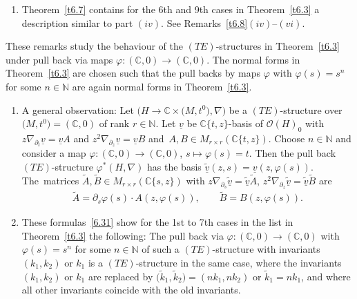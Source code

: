 \documentclass[10pt,a4paper]{amsart}
\numberwithin{equation}{section}
\numberwithin{figure}{section}
\newcommand{\N}{{\mathbb N}}
\newcommand{\C}{{\mathbb C}}
\newcommand{\OO}{{\mathcal O}}
\newcommand{\www}{\widetilde}
\newcommand{\uuuu}{\underline}
\newcommand{\paa}{\partial}
\newcommand{\nnn}{\nabla}
\begin{document}
\begin{Remarks}
\begin{enumerate}
{}

\item[$(v)$] Theorem~\ref{t6.7} contains for the 6th and 9th cases
in Theorem~\ref{t6.3} a description similar to part $(iv)$.
See Remarks~\ref{t6.8}$(iv)$--$(vi)$.
\end{enumerate}
\end{Remarks}


\begin{Remarks}\label{t6.5}
These remarks study the behaviour of the $(TE)$-structures
in Theorem~\ref{t6.3} under pull back via maps
$\varphi\colon (\C,0)\to(\C,0)$.
The normal forms in Theorem~\ref{t6.3}
are chosen such that the pull backs
by maps $\varphi$ with
$\varphi(s)=s^n$ for some $n\in\N$
are again normal forms in Theorem~\ref{t6.3}.

\begin{enumerate}\itemsep=0pt
\item[$(i)$] A general observation:
Let $\big(H\to\C\times \big(M,t^0\big),\nnn\big)$ be a $(TE)$-structure
over $\big(M,t^0\big)=(\C,0)$ of rank $r\in\N$.
Let $\uuuu{v}$ be $\C\{t,z\}$-basis
of $\OO(H)_0$ with $z\nnn_{\paa_t}\uuuu{v}=\uuuu{v}A$
and $z^2\nnn_{\paa_z}\uuuu{v}=\uuuu{v}B$ and~$A,B\in M_{r\times r}(\C\{t,z\})$.
Choose $n\in\N$ and consider a map
$\varphi\colon (\C,0)\to(\C,0)$, $s\mapsto \varphi(s)=t$.
Then the pull back $(TE)$-structure $\varphi^*(H,\nnn)$
has the basis $\uuuu{\www v}(z,s)=\uuuu{v}(z,\varphi(s))$.
The~matrices $\www A,\www B\in M_{r\times r}(\C\{s,z\})$
with $z\nnn_{\paa_s}\uuuu{\www v}=\uuuu{\www v}\www A$,
$z^2\nnn_{\paa_z}\uuuu{\www v}=\uuuu{\www v}\www B$ are
\begin{gather}\label{6.31}
\www A=\paa_s\varphi(s)\cdot A(z,\varphi(s)),\qquad
\www B=B(z,\varphi(s)).
\end{gather}

\item[$(ii)$] These formulas~\eqref{6.31} show for the 1st to 7th
cases in the list in Theorem~\ref{t6.3} the following:
The pull back via $\varphi\colon (\C,0)\to(\C,0)$ with
$\varphi(s)=s^n$ for some $n\in\N$
of such a $(TE)$-structure with invariants $(k_1,k_2)$
or $k_1$
is a $(TE)$-structure in the same case, where the invariants
$(k_1,k_2)$ or $k_1$ are replaced by $\big(\www k_1,\www k_2\big)=(nk_1,nk_2)$
or $\www{k}_1=nk_1$,
and where all other invariants coincide with the old invariants.


\end{enumerate}
\end{Remarks}
\end{document}
